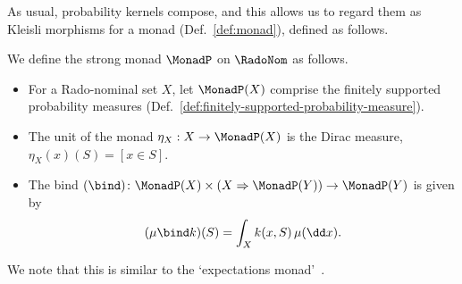   As usual, probability kernels compose, and this allows us to regard
  them as Kleisli morphisms for a monad (Def.~\ref{def:monad}), defined as follows.
\begin{definition}\label{def:monad-radonom}
  We define the strong monad $\MonadP$ on $\RadoNom$ as follows.
  \begin{itemize}
  \item For a Rado-nominal set $X$, let $\MonadP (X)$ comprise the
    finitely supported probability measures (Def.~\ref{def:finitely-supported-probability-measure}).
  \item
    The unit of the monad $\eta_X:X\to \MonadP (X)$ is the Dirac measure,
    $\eta_X(x)(S)=[x\in S]$.
  \item
    The bind $(\bind) \colon \MonadP (X)\times (X\Rightarrow \MonadP (Y))\to \MonadP (Y)$ is given
    by
    \[
      (\mu \bind k)(S)=\int_X k(x,S)\,\mu(\dd x).
    \]
  \end{itemize}
\end{definition}
We note that this is similar to the `expectations monad'~\cite[Thm.~4]{EPTCS95.12}. 
